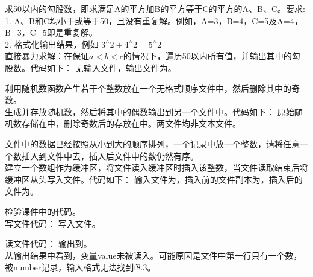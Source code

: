 \documentclass{ctexart}
\begin{document}
\maketitle

    \begin{answer}

        求50以内的勾股数，即求满足A的平方加B的平方等于C的平方的A、B、C。要求: \\
        1. A、B和C均小于或等于50，且没有重复解。例如，A=3，B=4，C=5及A=4，B=3，C=5即是重复解。\\
        2. 格式化输出结果，例如 $3^\land2+4^\land2=5^\land2$ \\

        直接暴力求解：在保证$a<b<c$的情况下，遍历50以内所有值，并输出其中的勾股数。代码如下：
        无输入文件，输出文件为。

        利用随机数函数产生若干个整数放在一个无格式顺序文件中，然后删除其中的奇数。\\

        生成并存放随机数，然后将其中的偶数输出到另一个文件中。代码如下：
        原始随机数存储在中，删除奇数后的存放在中。两文件均非文本文件。

        文件中的数据已经按照从小到大的顺序排列，一个记录中放一个整数，请将任意一个数插入到文件中去，插入后文件中的数仍然有序。\\

        建立一个数组作为缓冲区，将文件读入缓冲区时插入该整数，当文件读取结束后将缓冲区从头写入文件。代码如下：
        输入文件为，插入前的文件副本为，插入后的文件为。

        检验课件中的代码。\\

        写文件代码：
        写入文件。

        读文件代码：
        输出到。\\
        从输出结果中看到，变量value未被读入。可能原因是文件中第一行只有一个数，被number记录，输入格式无法找到f8.3。
    
    \end{answer}
\end{document}
